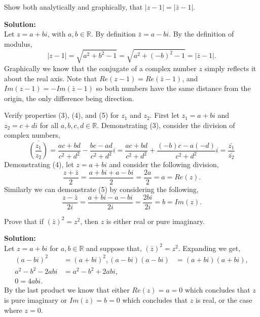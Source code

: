 \documentclass[12pt]{article}
\makeatletter
\theoremstyle{homework}
\newenvironment{exercise}[1]
{\def\@currentlabel{#1}\exercisecore}
{\endexercisecore}
\newcommand{\localhead}[1]{\par\smallskip\noindent\textbf{#1}\nobreak\\}%
\newcommand\solution{\localhead{Solution:}}
\newcommand{\Reals}{\ensuremath{\mathbb R}}
\let\RR\Reals
\makeatother
\begin{document}
\begin{exercise}{8} Show both analytically and graphically, that $|z - 1| = |\bar{z} - 1|$. \\
    \solution Let $z = a + bi$, with $a, b \in \RR$. By definition $\bar{z} = a - bi$. By the definition of modulus, 
    \begin{equation*}
        |z - 1| = \sqrt{a^2 + b^2 - 1} = \sqrt{a^2 + (-b)^2 - 1} = |\bar{z} - 1|.
    \end{equation*}
    Graphically we know that the conjugate of a complex number $z$ simply reflects it about the real axis. Note that 
    $Re(z - 1) = Re(\bar{z} - 1)$, and $Im(z - 1) = -Im(\bar{z} - 1)$ so both numbers have the same distance from the origin, the 
    only difference being direction. 
\end{exercise}
\vspace{1in}



\begin{exercise}{12} Verify properties (3), (4), and (5) for $z_1$ and $z_2$. 
    First let $z_1 = a + bi$ and $z_2 = c + di$ for all $a, b, c, d \in \RR$. Demonstrating (3), consider 
    the division of complex numbers, 
    \begin{equation*}
        \overline{\left(\dfrac{z_1}{z_2}\right)} = \dfrac{ac + bd}{c^2 + d^2} - \dfrac{bc - ad}{c^2 + d^2}i = \dfrac{ac + bd}{c^2 + d^2} + \dfrac{(-b)c - a(-d)}{c^2 + d^2}i =   \dfrac{\bar{z_1}}{\bar{z_2}}
    \end{equation*}
    Demonstrating (4), let $z = a + bi$ and consider the following division, 
    \begin{equation*}
        \dfrac{z + \bar{z}}{2} = \dfrac{a + bi + a - bi}{2} = \dfrac{2a}{2} = a = Re(z). 
    \end{equation*}
    Similarly we can demonstrate (5) by considering the following, 
    \begin{equation*}
        \dfrac{z - \bar{z}}{2i} = \dfrac{a + bi - a - bi}{2i} = \dfrac{2bi}{2i} = b = Im(z). 
    \end{equation*}
\end{exercise}
\vspace{1in}





\begin{exercise}{13} Prove that if $(\bar{z})^2 = z^2$, then $z$ is either real or pure imaginary.\\
    \solution Let $z = a + bi$ for $a, b \in \RR$ and suppose that, $(\bar{z})^2 = z^2$. Expanding we get, 
    \begin{align*}
        (a - bi)^2 &= (a + bi)^2,
        (a - bi)(a - bi) &= (a + bi)(a + bi),\\
        a^2 - b^2 - 2abi &=  a^2 - b^2 + 2abi,\\
        0 = 4abi. 
    \end{align*}
    By the last product we know that either $Re(z) = a = 0$ which concludes that $z$ is pure imaginary or  $Im(z) = b = 0$ 
    which concludes that $z$ is real, or the case where $z = 0$. 
\end{exercise}
\vspace{1in}
\end{document}
